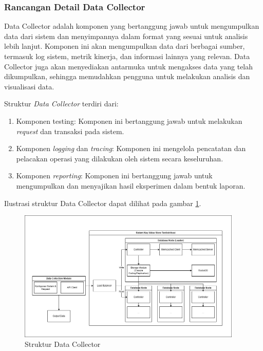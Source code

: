 \subsubsection{Rancangan Detail Data Collector}
\label{subsubsection:detail-data-collector}

Data Collector adalah komponen yang bertanggung jawab untuk mengumpulkan data dari sistem dan menyimpannya dalam format yang sesuai untuk analisis lebih lanjut. Komponen ini akan mengumpulkan data dari berbagai sumber, termasuk log sistem, metrik kinerja, dan informasi lainnya yang relevan.
Data Collector juga akan menyediakan antarmuka untuk mengakses data yang telah dikumpulkan, sehingga memudahkan pengguna untuk melakukan analisis dan visualisasi data.

Struktur \textit{Data Collector} terdiri dari:

\begin{enumerate}
    \item Komponen testing: Komponen ini bertanggung jawab untuk melakukan \textit{request} dan transaksi pada sistem.
    \item Komponen \textit{logging} dan \textit{tracing}: Komponen ini mengelola pencatatan dan pelacakan operasi yang dilakukan oleh sistem secara keseluruhan.
    \item Komponen \textit{reporting}: Komponen ini bertanggung jawab untuk mengumpulkan dan menyajikan hasil eksperimen dalam bentuk laporan.
\end{enumerate}

Ilustrasi struktur Data Collector dapat dilihat pada gambar \ref{fig:data-collector-structure}.

\begin{figure}[ht]
    \centering
    \includegraphics[width=0.95\textwidth]{resources/chapter-3/general-architecture.png}
    \caption{Struktur Data Collector}
    \label{fig:data-collector-structure}
\end{figure}